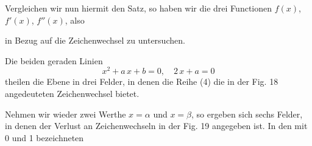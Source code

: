 Vergleichen wir nun hiermit den  Satz, so haben wir die drei Functionen $f(x)$, $f'(x)$, $f''(x)$, also


in Bezug auf die Zeichenwechsel zu untersuchen.

Die beiden geraden Linien
\[
x^2 + a\,x + b = 0,\quad 2\,x + a = 0
\]
theilen die Ebene in drei Felder, in denen die Reihe (4) die in der Fig. 18 angedeuteten Zeichenwechsel bietet.


Nehmen wir wieder zwei Werthe $x = \alpha$ und $x = \beta$, so ergeben sich sechs Felder, in denen der Verlust an Zeichenwechseln in der Fig. 19 angegeben ist. In den mit 0 und 1 bezeichneten
